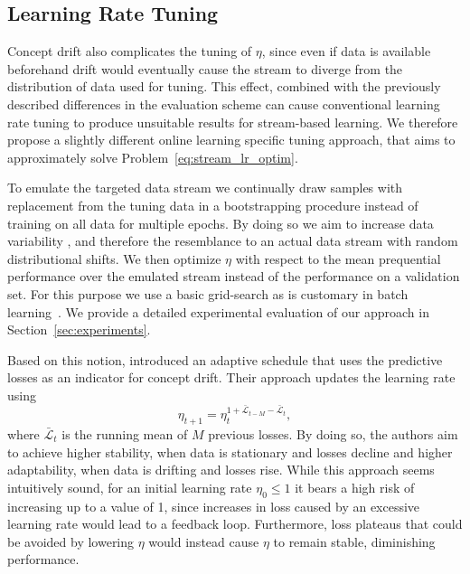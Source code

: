\documentclass[letterpaper]{article} %
\begin{document}
\subsection{Learning Rate Tuning}

Concept drift also complicates the tuning of $\eta$, since even if data is available beforehand drift would eventually cause the stream to diverge from the distribution of data used for tuning.
This effect, combined with the previously described differences in the evaluation scheme can cause conventional learning rate tuning to produce unsuitable results for stream-based learning.
We therefore propose a slightly different online learning specific tuning approach, that aims to approximately solve Problem~\ref{eq:stream_lr_optim}.

To emulate
the targeted data stream we continually draw samples with replacement from the tuning data in a bootstrapping procedure instead of training on all data for multiple epochs.
By doing so we aim to increase data variability%
, and therefore the resemblance to an actual data stream with random distributional shifts.
We then optimize $\eta$ with respect to the mean prequential performance over the emulated stream instead of the performance on a validation set.
For this purpose we use a basic grid-search as is customary in batch learning~\cite{defazioLearningRateFreeLearningDAdaptation2023a}.
We provide a detailed experimental evaluation of our approach in Section~\ref{sec:experiments}.



Based on this notion, \citet{kunchevaAdaptiveLearningRate2008} introduced an adaptive schedule that uses the predictive losses as an indicator for concept drift.
Their approach updates the learning rate using
\begin{equation}
	\eta_{t+1} = \eta_t^{1+	\bar{\mathcal{L}}_{t-M} - \bar{\mathcal{L}}_{t}},
\end{equation}
where $\bar{\mathcal{L}}_{t}$ is the running mean of $M$ previous losses.
By doing so, the authors aim to achieve higher stability, when data is stationary and losses decline and higher adaptability, when data is drifting and losses rise.
While this approach seems intuitively sound, for an initial learning rate $\eta_0 \leq 1$ it bears a high risk of increasing up to a value of 1, since increases in loss caused by an excessive learning rate would lead to a feedback loop.
Furthermore, loss plateaus that could be avoided by lowering $\eta$ would instead cause $\eta$ to remain stable, diminishing performance.
\end{document}
